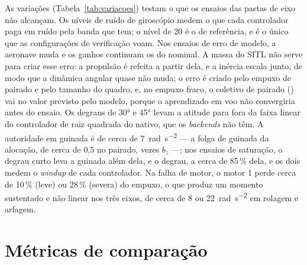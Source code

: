 As variações (Tabela~\ref{tab:variacoes}) testam o que os ensaios das pastas
de eixo não alcançam. Os níveis de ruído de giroscópio medem o que cada
controlador paga em ruído pela banda que tem; o nível de 20 é o de
referência, e é o único que as configurações de verificação voam. Nos
ensaios de erro de modelo, a aeronave muda e os ganhos continuam os do
nominal. A massa do SITL não serve para criar esse erro: a propulsão é
refeita a partir dela, e a inércia escala junto, de modo que a dinâmica
angular quase não muda; o erro é criado pelo empuxo de pairado e pelo
tamanho do quadro, e, no empuxo fraco, o coletivo de pairado
() vai no valor previsto pelo modelo, porque o
aprendizado em voo não convergiria antes do ensaio. Os degraus de \ang{30} e
\ang{45} levam a atitude para fora da faixa linear do controlador de
raiz quadrada do nativo, que os \textit{backends} não têm. A autoridade em
guinada é de cerca de \SI{7}{\radian\per\second\squared} --- a folga de
guinada da alocação, de cerca de 0,5 no pairado, vezes $b_z$ ---; nos ensaios
de saturação, o degrau curto leva a guinada além dela, e o degrau, a cerca de
85\,\% dela, e os dois medem o \textit{windup} de cada controlador. Na falha de motor, o motor 1 perde cerca
de 10\,\% (leve) ou 28\,\% (severa) do empuxo, o que produz um momento
sustentado e não linear nos três eixos, de cerca de 8 ou
\SI{22}{\radian\per\second\squared} em rolagem e arfagem.

\section{Métricas de comparação}
\label{sec:metricas}

